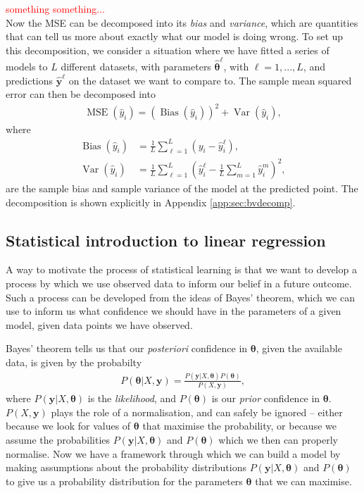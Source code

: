 \documentclass[twocolumn,english,notitlepage]{article}
\newcommand{\comment}[1]{\textcolor{red}{#1}\\}
\renewcommand{\vec}[1]{\boldsymbol{#1}}
\newcommand{\pclosed}[1]{\left(#1\right)}
\DeclareMathOperator{\mse}{\operatorname{MSE}}
\renewcommand{\var}{\operatorname{Var}}
\newcommand{\bias}{\operatorname{Bias}}
\begin{document}
        \comment{something something...}

        Now the MSE can be decomposed into its \textit{bias} and \textit{variance}, which are quantities that can tell us more about exactly what our model is doing wrong. To set up this decomposition, we consider a situation where we have fitted a series of models to $L$ different datasets, with parameters $\vec{\hat{\theta}}^\ell$, with $\ell=1,...,L$, and predictions $\vec{\hat{y}}^\ell$ on the dataset we want to compare to. The sample mean squared error can then be decomposed into
        \begin{align}
            \mse(\hat{y}_i) = \pclosed{\bias(\hat{y}_i)}^2 + \var(\hat{y}_i),
        \end{align}
        where 
        \begin{subequations}
            \begin{align}
                \bias(\hat{y}_i) &= \frac{1}{L}\sum_{\ell=1}^L \pclosed{y_i - \hat{y}_i^\ell}, \\
                \var(\hat{y}_i) &= \frac{1}{L}\sum_{\ell=1}^L \pclosed{\hat{y}_i^\ell - \frac{1}{L} \sum_{m=1}^L \hat{y}_i^m }^2,
            \end{align}
        \end{subequations}
        are the sample bias and sample variance of the model at the predicted point. The decomposition is shown explicitly in Appendix \ref{app:sec:bvdecomp}.
        


    \subsection{Statistical introduction to linear regression}
        A way to motivate the process of statistical learning is that we want to develop a process by which we use observed data to inform our belief in a future outcome. Such a process can be developed from the ideas of Bayes' theorem, which we can use to inform us what confidence we should have in the parameters of a given model, given data points we have observed.
        
        Bayes' theorem tells us that our \textit{posteriori} confidence in $\vec{\theta}$, given the available data, is given by the probabilty
        \begin{align}
            P(\vec{\theta}|X, \vec{y}) = \frac{P(\vec{y}|X,\vec{\vec{\theta}})P(\vec{\theta})}{P(X,\vec{y})},
        \end{align}
        where $P(\vec{y}|X, \vec{\theta})$ is the \textit{likelihood}, and $P(\vec{\theta})$ is our \textit{prior} confidence in $\vec{\theta}$. $P(X,\vec{y})$ plays the role of a normalisation, and can safely be ignored -- either because we look for values of $\vec{\theta}$ that maximise the probability, or because we assume the probabilities $P(\vec{y}|X,\vec{\theta})$ and $P(\vec{\theta})$ which we then can properly normalise. Now we have a framework through which we can build a model by making assumptions about the probability distributions $P(\vec{y}|X,\vec{\theta})$ and $P(\vec{\theta})$ to give us a probability distribution for the parameters $\vec{\theta}$ that we can maximise.
\end{document}
